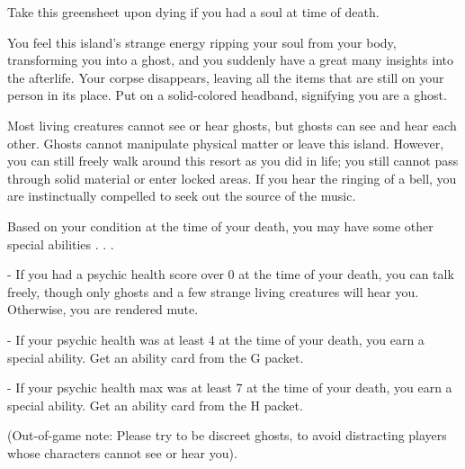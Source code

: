 \documentclass[green]{Kos}
\begin{document}
\name{\gGhost{}}

Take this greensheet upon dying if you had a soul at time of death.

You feel this island's strange energy ripping your soul from your body, transforming you into a ghost, and you suddenly have a great many insights into the afterlife. Your corpse disappears, leaving all the items that are still on your person in its place. Put on a solid-colored headband, signifying you are a ghost.

Most living creatures cannot see or hear ghosts, but ghosts can see and hear each other. Ghosts cannot manipulate physical matter or leave this island. However, you can still freely walk around this resort as you did in life; you still cannot pass through solid material or enter locked areas. If you hear the ringing of a bell, you are instinctually compelled to seek out the source of the music. 

Based on your condition at the time of your death, you may have some other special abilities . . . 

- If you had a psychic health score over 0 at the time of your death, you can talk freely, though only ghosts and a few strange living creatures will hear you. Otherwise, you are rendered mute.

- If your psychic health was at least 4 at the time of your death, you earn a special ability. Get an ability card from the G packet.

- If your psychic health max was at least 7 at the time of your death, you earn a special ability. Get an ability card from the H packet.


(Out-of-game note: Please try to be discreet ghosts, to avoid distracting players whose characters cannot see or hear you).
\end{document}
